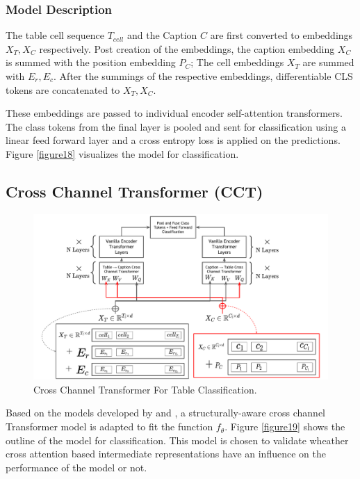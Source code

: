 \subsubsection{Model Description}
The table cell sequence $T_{cell}$ and the Caption $C$ are first converted to embeddings $X_T, X_C$ respectively. Post creation of the embeddings, the caption embedding  $X_C$ is summed with the position embedding $P_C$; The cell embeddings $X_T$ are summed with $E_r,E_c$. After the summings of the respective embeddings,  differentiable CLS tokens are concatenated to $X_T,X_C$.

These embeddings are passed to individual encoder self-attention transformers. The class tokens from the final layer is pooled and sent for classification using a linear feed forward layer and a cross entropy loss is applied on the predictions. Figure \ref{figure18} visualizes the model for classification. 


\subsection{Cross Channel Transformer (CCT) }
\label{table_classification:models:cross-channel}
\begin{figure}[h]
    \centering
    \includegraphics[width=\maxwidth{\textwidth}]{src/images/Pic-Export-CC-Trans-Thesis.pdf}
    \caption{Cross Channel Transformer For Table Classification. }
    \label{figure\arabic{figurecounter}}
\end{figure}

Based on the models developed by \cite{tsai2019multimodal} and \cite{deng2020turl}, a structurally-aware cross channel Transformer model is adapted to fit the function $f_\theta$. Figure \ref{figure19} shows the outline of the model for classification. This model is chosen to validate wheather cross attention based intermediate representations have an influence on the performance of the model or not. 
